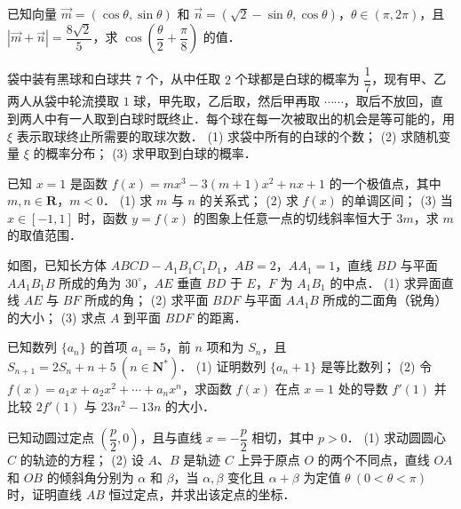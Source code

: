\begin{question}
已知向量 $\vec{m} = (\cos\theta, \sin\theta)$ 和 $\vec{n} = (\sqrt{2}-\sin\theta, \cos\theta)$，$\theta \in (\pi, 2\pi)$，且 $|\vec{m} + \vec{n}| = \dfrac{8\sqrt{2}}{5}$，求 $\cos\left(\dfrac{\theta}{2} + \dfrac{\pi}{8}\right)$ 的值．

\end{question}
\begin{question}
袋中装有黑球和白球共 $7$ 个，从中任取 $2$ 个球都是白球的概率为 $\dfrac{1}{7}$，现有甲、乙两人从袋中轮流摸取 $1$ 球，甲先取，乙后取，然后甲再取 $\cdots\cdots$，取后不放回，直到两人中有一人取到白球时既终止．每个球在每一次被取出的机会是等可能的，用 $\xi$ 表示取球终止所需要的取球次数．
(1) 求袋中所有的白球的个数；
(2) 求随机变量 $\xi$ 的概率分布；
(3) 求甲取到白球的概率．

\end{question}
\begin{question}
已知 $x = 1$ 是函数 $f(x) = mx^3 - 3(m+1)x^2 + nx + 1$ 的一个极值点，其中 $m, n \in \mathbf{R}$，$m < 0$．
(1) 求 $m$ 与 $n$ 的关系式；
(2) 求 $f(x)$ 的单调区间；
(3) 当 $x \in [-1, 1]$ 时，函数 $y = f(x)$ 的图象上任意一点的切线斜率恒大于 $3m$，求 $m$ 的取值范围．

\Needspace{0.4\textheight}
\end{question}
\begin{question}
如图，已知长方体 $ABCD - A_1B_1C_1D_1$，$AB = 2$，$AA_1 = 1$，直线 $BD$ 与平面 $AA_1B_1B$ 所成的角为 $30^\circ$，$AE$ 垂直 $BD$ 于 $E$，$F$ 为 $A_1B_1$ 的中点．
(1) 求异面直线 $AE$ 与 $BF$ 所成的角；
(2) 求平面 $BDF$ 与平面 $AA_1B$ 所成的二面角（锐角）的大小；
(3) 求点 $A$ 到平面 $BDF$ 的距离．
\nopagebreak[4]
\begin{center}\end{center}
\nopagebreak[4]
\end{question}
\begin{question}
已知数列 $\{a_n\}$ 的首项 $a_1 = 5$，前 $n$ 项和为 $S_n$，且 $S_{n+1} = 2S_n + n + 5\ (n \in \mathbf{N}^*)$．
(1) 证明数列 $\{a_n + 1\}$ 是等比数列；
(2) 令 $f(x) = a_1 x + a_2 x^2 + \cdots + a_n x^n$，求函数 $f(x)$ 在点 $x = 1$ 处的导数 $f'(1)$ 并比较 $2f'(1)$ 与 $23n^2 - 13n$ 的大小．

\end{question}
\begin{question}
已知动圆过定点 $\left(\dfrac{p}{2}, 0\right)$，且与直线 $x = -\dfrac{p}{2}$ 相切，其中 $p > 0$．
(1) 求动圆圆心 $C$ 的轨迹的方程；
(2) 设 $A$、$B$ 是轨迹 $C$ 上异于原点 $O$ 的两个不同点，直线 $OA$ 和 $OB$ 的倾斜角分别为 $\alpha$ 和 $\beta$，当 $\alpha, \beta$ 变化且 $\alpha + \beta$ 为定值 $\theta\ (0 < \theta < \pi)$ 时，证明直线 $AB$ 恒过定点，并求出该定点的坐标．

\end{question}